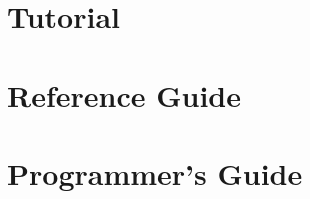 \documentclass{book}
\begin{document}


{
\setlength{\parskip}{\dPar}
\setlength{\parindent}{0ex}


}

\tableofcontents
\listoffigures

\setlength{\parskip}{\dPar}
\setlength{\parindent}{0ex}

\part{Tutorial}



\part{Reference Guide}








\part{Programmer's Guide}


\end{document}
